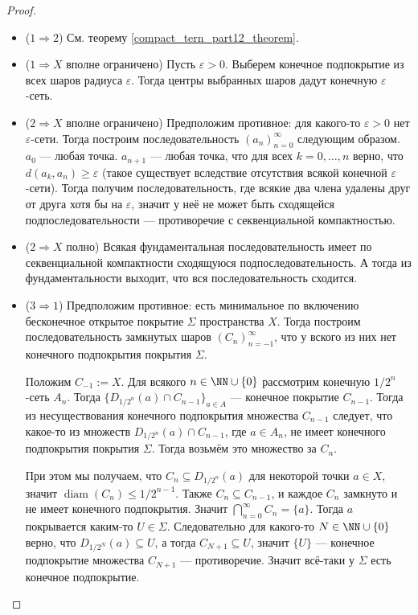 \documentclass[12pt,a4paper]{article}
\DeclareMathOperator{\diam}{diam}
\begin{document}
    \begin{proof}\ 
        \begin{itemize}
            \item ($1 \Rightarrow 2$) См. теорему \ref{compact_tern_part12_theorem}.
            \item ($1 \Rightarrow X$ вполне ограничено) Пусть $\varepsilon > 0$. Выберем конечное подпокрытие из всех шаров радиуса $\varepsilon$. Тогда центры выбранных шаров дадут конечную $\varepsilon$-сеть.
            \item ($2 \Rightarrow X$ вполне ограничено) Предположим противное: для какого-то $\varepsilon > 0$ нет $\varepsilon$-сети. Тогда построим последовательность $(a_n)_{n=0}^\infty$ следующим образом. $a_0$ --- любая точка. $a_{n+1}$ --- любая точка, что для всех $k = 0, \dots, n$ верно, что $d(a_k, a_n) \geqslant \varepsilon$ (такое существует вследствие отсутствия всякой конечной $\varepsilon$-сети). Тогда получим последовательность, где всякие два члена удалены друг от друга хотя бы на $\varepsilon$, значит у неё не может быть сходящейся подпоследовательности --- противоречие с секвенциальной компактностью.
            \item ($2 \Rightarrow X$ полно) Всякая фундаментальная последовательность имеет по секвенциальной компактности сходящуюся подпоследовательность. А тогда из фундаментальности выходит, что вся последовательность сходится.
            \item ($3 \Rightarrow 1$) Предположим противное: есть минимальное по включению бесконечное открытое покрытие $\Sigma$ пространства $X$. Тогда построим последовательность замкнутых шаров $(C_n)_{n=-1}^\infty$, что у вского из них нет конечного подпокрытия покрытия $\Sigma$.
            
            Положим $C_{-1} := X$. Для всякого $n \in \NN \cup \{0\}$ рассмотрим конечную $1/2^n$-сеть $A_n$. Тогда $\{D_{1/2^n}(a) \cap C_{n-1}\}_{a \in A}$ --- конечное покрытие $C_{n-1}$. Тогда из несуществования конечного подпокрытия множества $C_{n-1}$ следует, что какое-то из множеств $D_{1/2^n}(a) \cap C_{n-1}$, где $a \in A_n$, не имеет конечного подпокрытия покрытия $\Sigma$. Тогда возьмём это множество за $C_n$.

            При этом мы получаем, что $C_n \subseteq D_{1/2^n}(a)$ для некоторой точки $a \in X$, значит $\diam(C_n) \leqslant 1/2^{n-1}$. Также $C_n \subseteq C_{n-1}$, и каждое $C_n$ замкнуто и не имеет конечного подпокрытия. Значит $\bigcap_{n=0}^\infty C_n = \{a\}$. Тогда $a$ покрывается каким-то $U \in \Sigma$. Следовательно для какого-то $N \in \NN \cup \{0\}$ верно, что $D_{1/2^N}(a) \subseteq U$, а тогда $C_{N+1} \subseteq U$, значит $\{U\}$ --- конечное подпокрытие множества $C_{N+1}$ --- противоречие. Значит всё-таки у $\Sigma$ есть конечное подпокрытие.
        \end{itemize}
    \end{proof}
\end{document}
